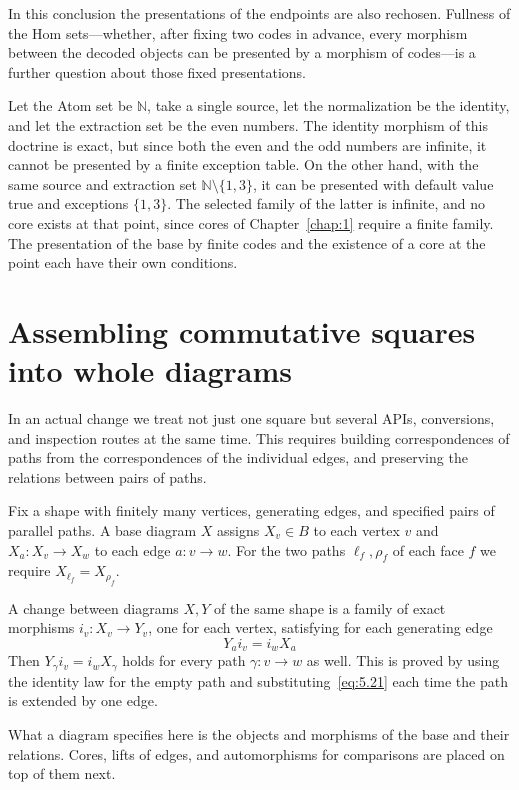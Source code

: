 In this conclusion the presentations of the endpoints are also rechosen. Fullness of the Hom
sets---whether, after fixing two codes in advance, every morphism between the decoded
objects can be presented by a morphism of codes---is a further question about those fixed
presentations.

\begin{example}\label{ex:5.16}

Let the Atom set be $\mathbb{N}$, take a single source, let the normalization be the
identity, and let the extraction set be the even numbers. The identity morphism of this
doctrine is exact, but since both the even and the odd numbers are infinite, it cannot be
presented by a finite exception table. On the other hand, with the same source and
extraction set $\mathbb{N}\setminus\{1,3\}$, it can be presented with default value true and
exceptions $\{1,3\}$. The selected family of the latter is infinite, and no core exists at
that point, since cores of Chapter~\ref{chap:1} require a finite family. The presentation of
the base by finite codes and the existence of a core at the point each have their own
conditions.

\end{example}

\section{Assembling commutative squares into whole diagrams}\label{sec:5.5}

In an actual change we treat not just one square but several APIs, conversions, and
inspection routes at the same time. This requires building correspondences of paths from the
correspondences of the individual edges, and preserving the relations between pairs of
paths.

\begin{definition}\label{def:5.17}

Fix a shape with finitely many vertices, generating edges, and specified pairs of parallel
paths. A base diagram $X$ assigns $X_v\in B$ to each vertex $v$ and $X_a:X_v\to X_w$ to each
edge $a:v\to w$. For the two paths $\ell_f,\rho_f$ of each face $f$ we require
$X_{\ell_f}=X_{\rho_f}$.

A change between diagrams $X,Y$ of the same shape is a family of exact morphisms
$i_v:X_v\to Y_v$, one for each vertex, satisfying for each generating edge
\begin{equation*}
Y_a i_v=i_w X_a
\tag{5.21}\label{eq:5.21}
\end{equation*}
Then $Y_\gamma i_v=i_wX_\gamma$ holds for every path $\gamma:v\to w$ as well. This is proved
by using the identity law for the empty path and substituting~\eqref{eq:5.21} each time the
path is extended by one edge.

What a diagram specifies here is the objects and morphisms of the base and their relations.
Cores, lifts of edges, and automorphisms for comparisons are placed on top of them next.

\end{definition}


